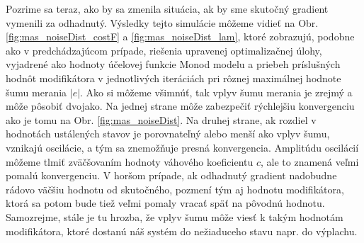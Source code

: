 Pozrime sa teraz, ako by sa zmenila situácia, ak by sme skutočný gradient vymenili za odhadnutý. Výsledky tejto simulácie môžeme vidieť na Obr. \ref{fig:mas_noiseDist_costF} a \ref{fig:mas_noiseDist_lam}, ktoré zobrazujú, podobne ako v predchádzajúcom prípade, riešenia upravenej optimalizačnej úlohy, vyjadrené ako hodnoty účelovej funkcie Monod modelu a priebeh príslušných hodnôt modifikátora v jednotlivých iteráciách pri rôznej maximálnej hodnote šumu merania $ \left|e\right| $. Ako si môžeme všimnúť, tak vplyv šumu merania je zrejmý a môže pôsobiť dvojako. Na jednej strane môže zabezpečiť rýchlejšiu konvergenciu ako je tomu na Obr.  \ref{fig:mas_noiseDist}. Na druhej strane, ak rozdiel v hodnotách ustálených stavov je porovnateľný alebo menší ako vplyv šumu, vznikajú oscilácie, a tým sa znemožňuje presná konvergencia. Amplitúdu oscilácií môžeme tlmiť zväčšovaním hodnoty váhového koeficientu $ c $, ale to znamená veľmi pomalú konvergenciu. V horšom prípade, ak odhadnutý gradient nadobudne rádovo väčšiu hodnotu od skutočného, pozmení tým aj hodnotu modifikátora, ktorá sa potom bude tiež veľmi pomaly vracať späť na pôvodnú hodnotu. Samozrejme, stále je tu hrozba, že vplyv šumu môže viesť k takým hodnotám modifikátora, ktoré dostanú náš systém do nežiaduceho stavu napr. do výplachu. 
